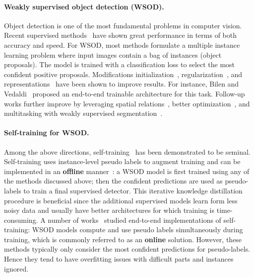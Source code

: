 \documentclass[10pt,twocolumn,letterpaper]{article}
\begin{document}
\paragraph{Weakly supervised object detection (WSOD).}
Object detection is one of the most fundamental problems in computer vision. Recent supervised methods~\cite{rcnn, fastrcnn, ren16faster, he2017maskrcnn, yolo, ssd, cornernet} have shown great performance in terms of both accuracy and speed. For WSOD, most methods formulate a multiple instance learning problem where input images contain a bag of instances (object proposals). The model is trained with a classification loss to select the most confident positive proposals. Modifications \wrt initialization~\cite{song14slsvm, siva_iccv13}, regularization~\cite{CinbisVS14,Bilen14b, WangZYB15}, and representations~\cite{CinbisVS14,BilenPT15, LiHLW016} have been shown to improve results. For instance, Bilen and Vedaldi~\cite{Bilen16} proposed an end-to-end trainable architecture for this task. Follow-up works further improve by leveraging spatial relations~\cite{tang2017multiple, tang2018pcl, KantorovOCL16}, better optimization~\cite{zigzag, JieWJFL17, Arun_2019, c-mil}, and multitasking with weakly supervised segmentation~\cite{Ge_2018_CVPR, Shen_2019_CVPR, Gao_2019_ICCV, singh-cvpr2019}.  

\vspace{-1em}
\paragraph{Self-training for WSOD.} 
Among the above directions, self-training~\cite{zou2018unsupervised,Zou_2019_ICCV} has been demonstrated to be seminal. Self-training uses instance-level pseudo labels to augment training and can be implemented in an \textbf{offline} manner~\cite{Zhang_2018_CVPR, krishna-cvpr2016, LiHLW016, Zhang_2018_CVPR}: a WSOD model is first trained using any of the methods discussed above; then the confident predictions  are used as pseudo-labels to train a final supervised detector. This iterative knowledge distillation procedure is beneficial since the additional supervised models learn form less noisy data and usually have better architectures for which training is  time-consuming. A number of works~\cite{tang2017multiple, tang2018pcl, c-mil, Gao_2019_ICCV, Zeng_2019_ICCV, TangWWYLHY18} studied end-to-end implementations of self-training: WSOD models compute and use pseudo labels simultaneously during training, which is commonly referred to as an \textbf{online} solution.
However, these methods typically only consider the most confident predictions for pseudo-labels. Hence they tend to have overfitting issues with difficult parts and instances ignored.
\end{document}
